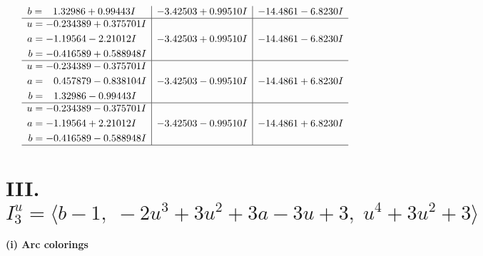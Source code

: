 \documentclass[1p]{elsarticle_modified}
\theoremstyle{definition}
\begin{document}
$$\begin{array}{c|c|c}
\begin{aligned}
b &= \phantom{-}1.32986 + 0.99443 I\end{aligned}
 & -3.42503 + 0.99510 I & -14.4861 - 6.8230 I \\ \hline\begin{aligned}
u &= -0.234389 + 0.375701 I \\
a &= -1.19564 - 2.21012 I \\
b &= -0.416589 + 0.588948 I\end{aligned}
 & -3.42503 + 0.99510 I & -14.4861 - 6.8230 I \\ \hline\begin{aligned}
u &= -0.234389 - 0.375701 I \\
a &= \phantom{-}0.457879 - 0.838104 I \\
b &= \phantom{-}1.32986 - 0.99443 I\end{aligned}
 & -3.42503 - 0.99510 I & -14.4861 + 6.8230 I \\ \hline\begin{aligned}
u &= -0.234389 - 0.375701 I \\
a &= -1.19564 + 2.21012 I \\
b &= -0.416589 - 0.588948 I\end{aligned}
 & -3.42503 - 0.99510 I & -14.4861 + 6.8230 I\\
 \hline 
 \end{array}$$\newpage\newpage\renewcommand{\arraystretch}{1}
\centering \section*{III. $I^u_{3}= \langle b-1,\;-2 u^3+3 u^2+3 a-3 u+3,\;u^4+3 u^2+3 \rangle$}
\flushleft \textbf{(i) Arc colorings}\\
\end{document}

